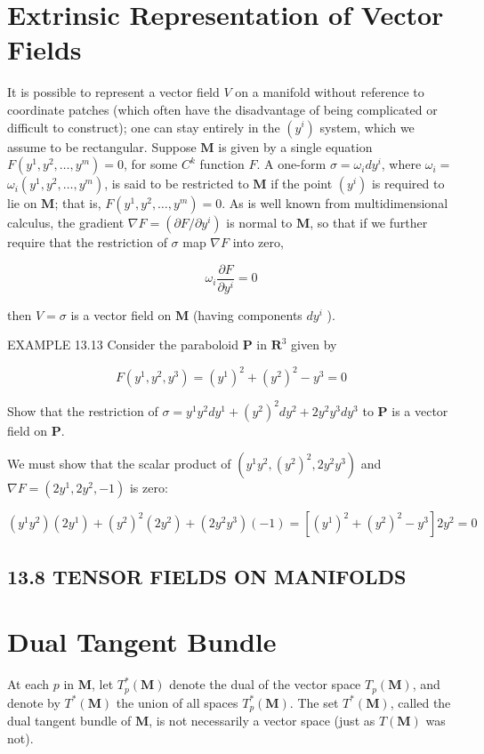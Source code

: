 \documentclass[10pt]{article}
\begin{document}
\section*{Extrinsic Representation of Vector Fields}
It is possible to represent a vector field $V$ on a manifold without reference to coordinate patches (which often have the disadvantage of being complicated or difficult to construct); one can stay entirely in the $\left(y^{i}\right)$ system, which we assume to be rectangular. Suppose $\mathbf{M}$ is given by a single equation $F\left(y^{1}, y^{2}, \ldots, y^{m}\right)=0$, for some $C^{k}$ function $F$. A one-form $\sigma=\omega_{i} d y^{i}$, where $\omega_{i}=$ $\omega_{i}\left(y^{1}, y^{2}, \ldots, y^{m}\right)$, is said to be restricted to $\mathbf{M}$ if the point $\left(y^{i}\right)$ is required to lie on $\mathbf{M}$; that is, $F\left(y^{1}, y^{2}, \ldots, y^{m}\right)=0$. As is well known from multidimensional calculus, the gradient $\nabla F=\left(\partial F / \partial y^{i}\right)$ is normal to $\mathbf{M}$, so that if we further require that the restriction of $\sigma$ map $\nabla F$ into zero,

$$
\omega_{i} \frac{\partial F}{\partial y^{i}}=0
$$

then $V=\sigma$ is a vector field on $\mathbf{M}$ (having components $d y^{i}$ ).

EXAMPLE 13.13 Consider the paraboloid $\mathbf{P}$ in $\mathbf{R}^{3}$ given by

$$
F\left(y^{1}, y^{2}, y^{3}\right)=\left(y^{1}\right)^{2}+\left(y^{2}\right)^{2}-y^{3}=0
$$

Show that the restriction of $\sigma=y^{1} y^{2} d y^{1}+\left(y^{2}\right)^{2} d y^{2}+2 y^{2} y^{3} d y^{3}$ to $\mathbf{P}$ is a vector field on $\mathbf{P}$.

We must show that the scalar product of $\left(y^{1} y^{2},\left(y^{2}\right)^{2}, 2 y^{2} y^{3}\right)$ and $\nabla F=\left(2 y^{1}, 2 y^{2},-1\right)$ is zero:

$$
\left(y^{1} y^{2}\right)\left(2 y^{1}\right)+\left(y^{2}\right)^{2}\left(2 y^{2}\right)+\left(2 y^{2} y^{3}\right)(-1)=\left[\left(y^{1}\right)^{2}+\left(y^{2}\right)^{2}-y^{3}\right] 2 y^{2}=0
$$

\subsection*{13.8 TENSOR FIELDS ON MANIFOLDS}
\section*{Dual Tangent Bundle}
At each $p$ in $\mathbf{M}$, let $T_{p}^{*}(\mathbf{M})$ denote the dual of the vector space $T_{p}(\mathbf{M})$, and denote by $T^{*}(\mathbf{M})$ the union of all spaces $T_{p}^{*}(\mathbf{M})$. The set $T^{*}(\mathbf{M})$, called the dual tangent bundle of $\mathbf{M}$, is not necessarily a vector space (just as $T(\mathbf{M})$ was not).
\end{document}
